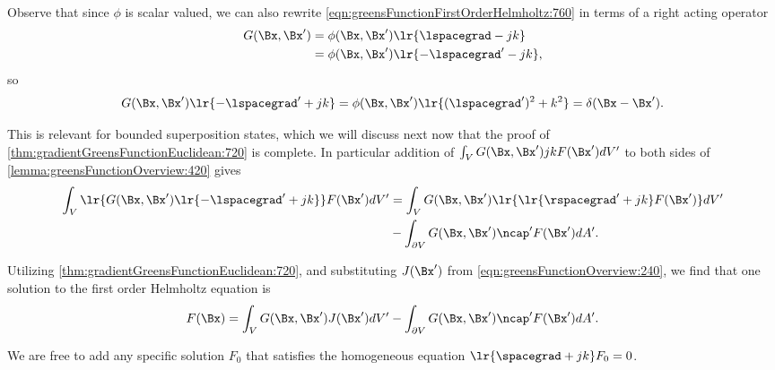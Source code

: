 Observe that since \( \phi \) is scalar valued, we can also rewrite
\cref{eqn:greensFunctionFirstOrderHelmholtz:760} in terms of a right acting operator
\begin{equation}\label{eqn:greensFunctionFirstOrderHelmholtz:800}
\begin{aligned}
G(\Bx, \Bx')
&= \phi(\Bx, \Bx') \lr{ \lspacegrad - j k } \\
&= \phi(\Bx, \Bx') \lr{ -\lspacegrad' - j k },
\end{aligned}
\end{equation}
so
\begin{equation}\label{eqn:greensFunctionFirstOrderHelmholtz:820}
G(\Bx, \Bx') \lr{ -\lspacegrad' + j k } =
\phi(\Bx, \Bx') \lr{ (\lspacegrad')^2 + k^2 }
=
\delta(\Bx - \Bx').
\end{equation}

This is relevant for bounded superposition states, which we will discuss next now that the proof of
\cref{thm:gradientGreensFunctionEuclidean:720} is complete.
In particular addition of
\( \int_V G(\Bx, \Bx') j k F(\Bx') dV' \) to both sides of \cref{lemma:greensFunctionOverview:420} gives
\begin{dmath}\label{eqn:greensFunctionFirstOrderHelmholtz:860}
\begin{aligned}
\int_V \lr{ G(\Bx, \Bx') \lr{ -\lspacegrad' + j k } } F(\Bx') dV'
&=
\int_V G(\Bx, \Bx') \lr{ \lr{ \rspacegrad' + j k } F(\Bx') } dV' \\
&-
\int_{\partial V} G(\Bx, \Bx') \ncap' F(\Bx') dA'.
\end{aligned}
\end{dmath}

Utilizing \cref{thm:gradientGreensFunctionEuclidean:720}, and substituting \( J(\Bx') \)
from \cref{eqn:greensFunctionOverview:240},
we find that one solution to the first order Helmholtz equation is
\begin{dmath}\label{eqn:greensFunctionFirstOrderHelmholtz:880}
F(\Bx)
=
\int_V G(\Bx, \Bx') J(\Bx') dV'
-
\int_{\partial V} G(\Bx, \Bx') \ncap' F(\Bx') dA'.
\end{dmath}

We are free to
add any specific solution \( F_0 \) that satisfies the homogeneous equation \( \lr{ \spacegrad + j k } F_0 = 0 \).

